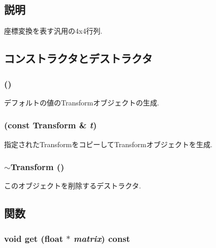 \subsection{説明}
座標変換を表す汎用の4x4行列. 

\subsection{コンストラクタとデストラクタ}
\hypertarget{classm3g_1_1Transform_9de68ec1c9b7809129814a3233ae4655}{
\subsubsection[{Transform}]{ ()}}
\label{classm3g_1_1Transform_9de68ec1c9b7809129814a3233ae4655}


デフォルトの値のTransformオブジェクトの生成. \hypertarget{classm3g_1_1Transform_6f8c18ec2bd6b5c0d7f3472752ec79d1}{
\subsubsection[{Transform}]{ (const {\bf Transform} \& {\em t})}}
\label{classm3g_1_1Transform_6f8c18ec2bd6b5c0d7f3472752ec79d1}


指定されたTransformをコピーしてTransformオブジェクトを生成. \hypertarget{classm3g_1_1Transform_8e627263611a76aad02c9e0b89287c68}{
\subsubsection[{$\sim$Transform}]{\setlength{\rightskip}{0pt plus 5cm}$\sim${\bf Transform} ()}}
\label{classm3g_1_1Transform_8e627263611a76aad02c9e0b89287c68}


このオブジェクトを削除するデストラクタ. 

\subsection{関数}
\hypertarget{classm3g_1_1Transform_f78faf7dcc06f53604ad08965babb7b3}{
\subsubsection[{get}]{\setlength{\rightskip}{0pt plus 5cm}void get (float $\ast$ {\em matrix}) const}}
\label{classm3g_1_1Transform_f78faf7dcc06f53604ad08965babb7b3}



